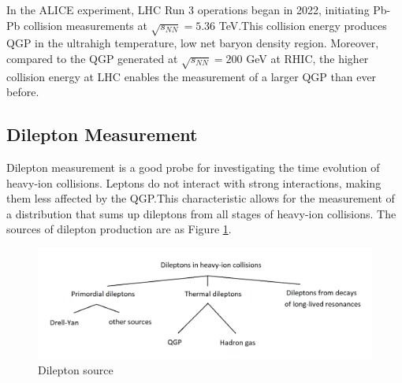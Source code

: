         In the ALICE experiment, LHC Run 3 operations began in 2022, initiating Pb-Pb collision measurements at $\sqrt{s_{NN}} = 5.36$ TeV.\@ This collision energy produces QGP in the ultrahigh temperature, low net baryon density region. Moreover, compared to the QGP generated at $\sqrt{s_{NN}} = 200$ GeV at RHIC, the higher collision energy at LHC enables the measurement of a larger QGP than ever before.
    \subsection{Dilepton Measurement}
        Dilepton measurement is a good probe for investigating the time evolution of heavy-ion collisions. Leptons do not interact with strong interactions, making them less affected by the QGP.\@ This characteristic allows for the measurement of a distribution that sums up dileptons from all stages of heavy-ion collisions. The sources of dilepton production are as Figure \ref{Intro:Dilepton:dilepton_source}.
        \begin{figure}[hbtp]
            \centering
            \includegraphics[keepaspectratio, scale=0.3]{fig/1_5_dilepton_source.png}
            \caption{Dilepton source\cite{Geurts:2022xmk}}
            \label{Intro:Dilepton:dilepton_source}
        \end{figure}
        
